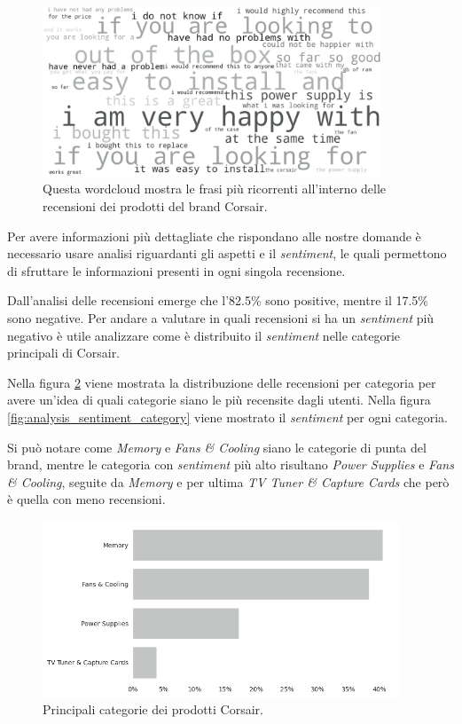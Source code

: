 \begin{figure}[ht]
    \centering
    \includegraphics[width=0.9\textwidth]{images/analysis/wc_text_phrases.png}
    \caption{Questa wordcloud mostra le frasi più ricorrenti all'interno delle recensioni dei prodotti del brand Corsair.}
    \label{fig:analysis_text_phrases}
\end{figure}

Per avere informazioni più dettagliate che rispondano alle nostre domande è necessario usare analisi riguardanti gli aspetti e il \textit{sentiment}, le quali permettono di sfruttare le informazioni presenti in ogni singola recensione. 

Dall'analisi delle recensioni emerge che l'82.5\% sono positive, mentre il 17.5\% sono negative. Per andare a valutare in quali recensioni si ha un \textit{sentiment} più negativo è utile analizzare come è distribuito il \textit{sentiment} nelle categorie principali di Corsair.

Nella figura \ref{fig:analysis_category} viene mostrata la distribuzione delle recensioni per categoria
per avere un'idea di quali categorie siano le più recensite dagli utenti. Nella figura \ref{fig:analysis_sentiment_category} viene mostrato il \textit{sentiment} per ogni categoria.

Si può notare come \textit{Memory} e \textit{Fans \& Cooling} siano le categorie di punta del brand, mentre le categoria con \textit{sentiment} più alto risultano \textit{Power Supplies} e \textit{Fans \& Cooling}, seguite da \textit{Memory} e per ultima \textit{TV Tuner \& Capture Cards} che però è quella con meno recensioni.

\begin{figure}[ht]
  \centering
  \includegraphics[width=0.95\textwidth]{images/analysis/categories.png}
  \caption{Principali categorie dei prodotti Corsair.}
  \label{fig:analysis_category}
\end{figure}

